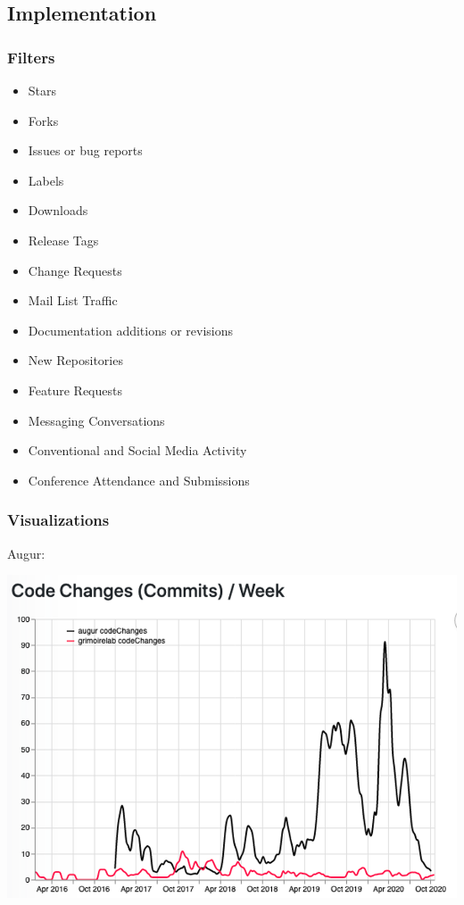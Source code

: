 \hypertarget{implementation}{%
\subsection{Implementation}\label{implementation}}

\hypertarget{filters}{%
\subsubsection{Filters}\label{filters}}

\begin{itemize}
\tightlist
\item
  Stars
\item
  Forks
\item
  Issues or bug reports
\item
  Labels
\item
  Downloads
\item
  Release Tags
\item
  Change Requests
\item
  Mail List Traffic
\item
  Documentation additions or revisions
\item
  New Repositories
\item
  Feature Requests
\item
  Messaging Conversations
\item
  Conventional and Social Media Activity
\item
  Conference Attendance and Submissions
\end{itemize}

\hypertarget{visualizations}{%
\subsubsection{Visualizations}\label{visualizations}}

Augur:

\includegraphics{images/burstiness_augur.png}

